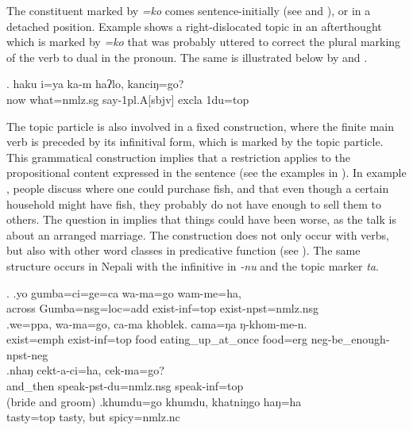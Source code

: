 The constituent marked by \emph{=ko} comes sentence-initially (see \LLast and \Last), or in a detached position. Example \Next shows a right-dislocated topic in an afterthought which is marked by \emph{=ko} that was probably uttered to correct the plural marking of the verb to dual in the pronoun. The same is illustrated below by \NNext[b] and \NNext[c].

\exg.  haku i=ya  ka-m  haʔlo, kanciŋ=go?\\
	now what{\sc =nmlz.sg} say{\sc -1pl.A[sbjv]} {\sc excla} {\sc 1du=top} \\
	 		

	
The topic particle is also involved in a fixed construction, where the finite main verb is preceded by its infinitival form, which is marked by the topic particle. This grammatical construction implies that a restriction applies to the propositional content expressed in the sentence  (see the examples in \Next). In example \Next[a], people discuss where one could purchase fish, and that even though a certain household might have fish, they probably do not have enough to sell them to others. The question in \Next[c] implies that things could have been worse, as the talk is about an arranged marriage. The construction does not only occur with verbs, but also with other word classes in predicative function (see \Next[d]). The same structure occurs in Nepali with the infinitive in \emph{-nu} and the topic marker \emph{ta}. 

\ex. \ag.yo    gumba=ci=ge=ca  wa-ma=go  wam-me=ha, \\
across Gumba{\sc =nsg=loc=add} exist{\sc -inf=top} exist{\sc [3sg]-npst=nmlz.nsg}\\
 
\bg.we=ppa,             wa-ma=go,          ca-ma khoblek. cama=ŋa   ŋ-khom-me-n.\\
exist{\sc [3sg;npst]=emph} exist{\sc -inf=top} food eating\_up\_at\_once food{\sc =erg} {\sc neg-}be\_enough{\sc [1.P]-npst-neg}\\
 
\bg.nhaŋ    cekt-a-ci=ha,                cek-ma=go?\\
and\_then speak{\sc -pst-du=nmlz.nsg} speak{\sc -inf=top}\\
 (bride and groom) 
\bg.khumdu=go khumdu, khatniŋgo haŋ=ha\\
tasty{\sc =top} tasty, but spicy{\sc =nmlz.nc} \\


